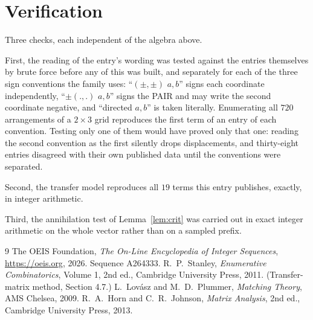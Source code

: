 \documentclass[11pt,a4paper]{article}
\theoremstyle{plain}
\theoremstyle{definition}
\begin{document}
\section{Verification}

Three checks, each independent of the algebra above.

First, the reading of the entry's wording was tested against the entries themselves by brute
force before any of this was built, and separately for each of the three sign conventions the
family uses: ``$(\pm,\pm)$ $a,b$'' signs each coordinate independently, ``$\pm(.,.)$ $a,b$''
signs the PAIR and may write the second coordinate negative, and ``directed $a,b$'' is taken
literally. Enumerating all $720$ arrangements of a $2\times3$ grid reproduces the first term
of an entry of each convention. Testing only one of them would have proved only that one:
reading the second convention as the first silently drops displacements, and thirty-eight
entries disagreed with their own published data until the conventions were separated.

Second, the transfer model reproduces all $19$ terms this entry publishes, exactly, in
integer arithmetic.

Third, the annihilation test of Lemma~\ref{lem:crit} was carried out in exact integer
arithmetic on the whole vector rather than on a sampled prefix.

\begin{thebibliography}{9}
 The OEIS Foundation, \emph{The On-Line Encyclopedia of Integer
Sequences}, \url{https://oeis.org}, 2026. Sequence A264333.
 R.~P.~Stanley, \emph{Enumerative Combinatorics}, Volume 1, 2nd ed.,
Cambridge University Press, 2011. (Transfer-matrix method, Section 4.7.)
 L.~Lov\'asz and M.~D.~Plummer, \emph{Matching Theory}, AMS Chelsea, 2009.
 R.~A.~Horn and C.~R.~Johnson, \emph{Matrix Analysis}, 2nd ed., Cambridge
University Press, 2013.
\end{thebibliography}
\end{document}
